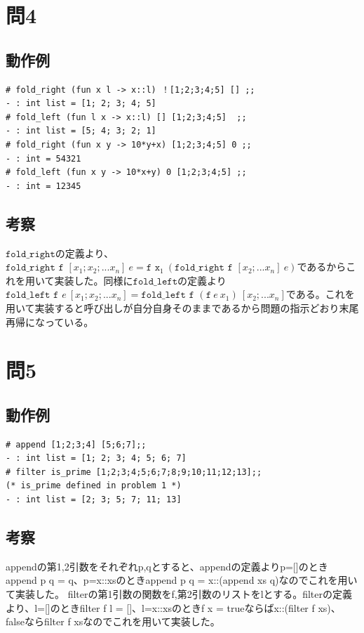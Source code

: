 \documentclass[11pt,a4paper]{jsarticle}
\begin{document}
\section*{問4}
\subsection*{動作例}
\begin{lstlisting}[basicstyle=\ttfamily\footnotesize, frame=single]
# fold_right (fun x l -> x::l) ！[1;2;3;4;5] [] ;;
- : int list = [1; 2; 3; 4; 5]
# fold_left (fun l x -> x::l) [] [1;2;3;4;5]  ;;
- : int list = [5; 4; 3; 2; 1]
# fold_right (fun x y -> 10*y+x) [1;2;3;4;5] 0 ;;
- : int = 54321
# fold_left (fun x y -> 10*x+y) 0 [1;2;3;4;5] ;;
- : int = 12345
 \end{lstlisting}
\subsection*{考察}
$\texttt{fold\_right}$の定義より、$\texttt{fold\_right f }[x_1;x_2;...x_n] \ e =  \texttt{f x}_1 \ (\texttt{fold\_right f }[x_2;...x_n] \ e)$であるからこれを用いて実装した。同様に$\texttt{fold\_left}$の定義より$\texttt{fold\_left f }e \ [x_1;x_2;...x_n] =  \texttt{fold\_left f }(\texttt{f}\ e\ x_1)\ [x_2;...x_n]$である。これを用いて実装すると呼び出しが自分自身そのままであるから問題の指示どおり末尾再帰になっている。
\section*{問5}
\subsection*{動作例}
\begin{lstlisting}[basicstyle=\ttfamily\footnotesize, frame=single]
# append [1;2;3;4] [5;6;7];;
- : int list = [1; 2; 3; 4; 5; 6; 7]
# filter is_prime [1;2;3;4;5;6;7;8;9;10;11;12;13];; 
(* is_prime defined in problem 1 *)
- : int list = [2; 3; 5; 7; 11; 13]
 \end{lstlisting}
\subsection*{考察}
appendの第1,2引数をそれぞれp,qとすると、appendの定義よりp=[]のときappend p q = q、p=x::xsのときappend p q = x::(append xs q)なのでこれを用いて実装した。
filterの第1引数の関数をf,第2引数のリストをlとする。filterの定義より、l=[]のときfilter f l = []、l=x::xsのときf x = trueならばx::(filter f xs)、falseならfilter f xsなのでこれを用いて実装した。
\end{document}
